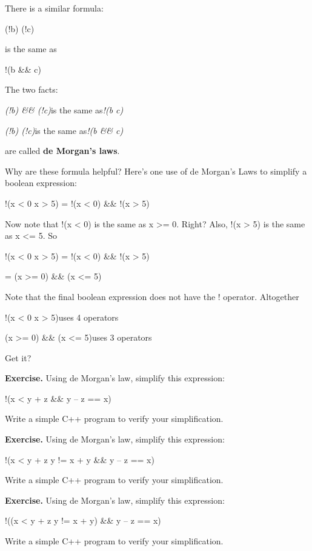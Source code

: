 \documentclass[
]{article}
\begin{document}
There is a similar formula:

(!b) \textbar\textbar{} (!c)

is the same as

!(b \&\& c)

The two facts:

\emph{(!b) \&\& (!c)}is the same as\emph{!(b \textbar\textbar{} c)}

\emph{(!b) \textbar\textbar{} (!c)}is the same as\emph{!(b \&\& c)}

are called \textbf{de Morgan's laws}.

Why are these formula helpful? Here's one use of de Morgan's Laws to
simplify a boolean expression:

!(x \textless{} 0 \textbar\textbar{} x \textgreater{} 5) = !(x
\textless{} 0) \&\& !(x \textgreater{} 5)

Now note that !(x \textless{} 0) is the same as x \textgreater= 0.
Right? Also, !(x \textgreater{} 5) is the same as x \textless= 5. So

!(x \textless{} 0 \textbar\textbar{} x \textgreater{} 5) = !(x
\textless{} 0) \&\& !(x \textgreater{} 5)

= (x \textgreater= 0) \&\& (x \textless= 5)

Note that the final boolean expression does not have the ! operator.
Altogether

!(x \textless{} 0 \textbar\textbar{} x \textgreater{} 5)uses 4 operators

(x \textgreater= 0) \&\& (x \textless= 5)uses 3 operators

Get it?

\textbf{Exercise.} Using de Morgan's law, simplify this expression:

!(x \textless{} y + z \&\& y -- z == x)

Write a simple C++ program to verify your simplification.

\textbf{Exercise.} Using de Morgan's law, simplify this expression:

!(x \textless{} y + z \textbar\textbar{} y != x + y \&\& y -- z == x)

Write a simple C++ program to verify your simplification.

\textbf{Exercise.} Using de Morgan's law, simplify this expression:

!((x \textless{} y + z \textbar\textbar{} y != x + y) \&\& y -- z == x)

Write a simple C++ program to verify your simplification.
\end{document}
